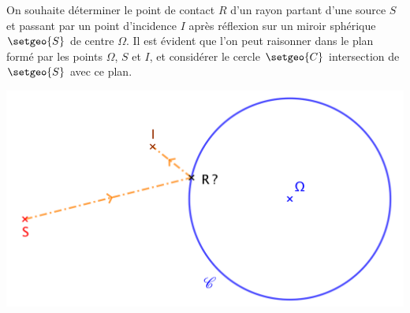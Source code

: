 On souhaite déterminer le point de contact $R$ d'un rayon partant d'une source $S$ et passant par un point d'incidence $I$ après réflexion sur un miroir sphérique $\setgeo{S}$ de centre $\Omega$. Il est évident que l'on peut raisonner dans le plan formé par les points $\Omega$, $S$ et $I$, et considérer le cercle $\setgeo{C}$ intersection de $\setgeo{S}$ avec ce plan.

\medskip

\begin{center}
	\includegraphics[scale=.75]{intro.png}
\end{center}
